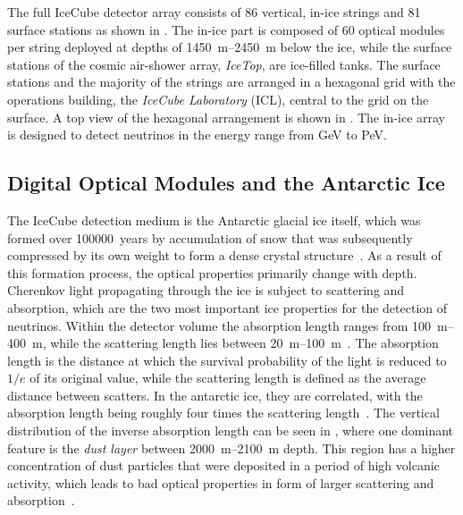 The full IceCube detector array consists of 86 vertical, in-ice strings and 81 surface stations as shown in . The in-ice part is composed of 60 optical modules per string deployed at depths of \SIrange[range-phrase={~-~}]{1450}{2450}{\meter} below the ice, while the surface stations of the cosmic air-shower array, \textit{IceTop}, are ice-filled tanks. The surface stations and the majority of the strings are arranged in a hexagonal grid with the operations building, the \textit{IceCube Laboratory} (ICL), central to the grid on the surface. A top view of the hexagonal arrangement is shown in . The in-ice array is designed to detect neutrinos in the energy range from \si{\giga\electronvolt} to \si{\peta\electronvolt}.


\subsection{Digital Optical Modules and the Antarctic Ice} 

The IceCube detection medium is the Antarctic glacial ice itself, which was formed over \SI{100000}{years} by accumulation of snow that was subsequently compressed by its own weight to form a dense crystal structure~. As a result of this formation process, the optical properties primarily change with depth. Cherenkov light propagating through the ice is subject to scattering and absorption, which are the two most important ice properties for the detection of neutrinos. Within the detector volume the absorption length ranges from \SIrange[range-phrase={~-~}]{100}{400}{\meter}, while the scattering length lies between \SIrange[range-phrase={~and~}]{20}{100}{\meter}~. The absorption length is the distance at which the survival probability of the light is reduced to $1/e$ of its original value, while the scattering length is defined as the average distance between scatters. In the antarctic ice, they are correlated, with the absorption length being roughly four times the scattering length~. The vertical distribution of the inverse absorption length can be seen in , where one dominant feature is the \textit{dust layer} between \SIrange[range-phrase={~and~}]{2000}{2100}{\meter} depth. This region has a higher concentration of dust particles that were deposited in a period of high volcanic activity, which leads to bad optical properties in form of larger scattering and absorption~\cite{icecube_ice_paper}.



